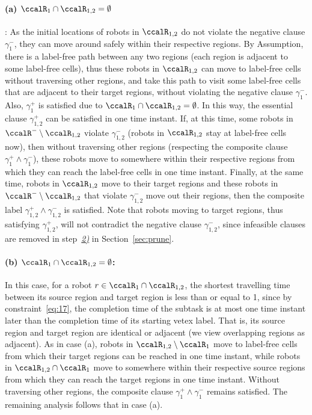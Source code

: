 \documentclass[Afour,sageh,times]{sagej}
\begin{document}
{{\paragraph{(a) $\ccalR_1 \cap \ccalR_{1,2} = \emptyset$}: As the initial locations of robots in $\ccalR_{1,2} $ do not violate the negative clause $\gamma_1^-$, they can move around safely  within their respective regions. By Assumption, there is a label-free path between any two regions (each region is adjacent to some label-free cells), thus these robots in $\ccalR_{1,2}$ can move to label-free cells without traversing other regions, and take this path to visit some label-free cells that are adjacent to their target regions, without violating the negative clause $\gamma_1^-$. Also, $\gamma_1^+$ is satisfied due to $\ccalR_1 \cap \ccalR_{1,2} = \emptyset$. In this way, the essential clause $\gamma_{1,2}^+$ can be satisfied in one time instant. If, at this time, some robots in $\ccalR^-\setminus \ccalR_{1,2}$ violate $\gamma_{1,2}^-$ (robots in $\ccalR_{1,2}$ stay at label-free cells now), then without traversing other regions (respecting the composite clause $\gamma_1^+ \wedge \gamma_1^-$), these robots  move to somewhere within their respective regions from which they can reach the label-free cells in one time instant. Finally, at the same time, robots in $\ccalR_{1,2}$ move to their target regions and these robots in $\ccalR^-\setminus \ccalR_{1,2}$ that violate $\gamma_{1,2}^-$   move out their regions, then the composite label $\gamma_{1,2}^+ \wedge \gamma_{1,2}^-$ is satisfied. Note that robots moving to target regions, thus satisfying $\gamma_{1,2}^+$, will not contradict the negative clause $\gamma_{1,2}^-$, since infeasible clauses are removed in step~\hyperref[prune:exclusion2]{\it 2)} in Section~\ref{sec:prune}.


\paragraph{(b) $\ccalR_1 \cap \ccalR_{1,2} = \emptyset$:} In this case, for a robot $r \in  \ccalR_1 \cap \ccalR_{1,2}$, the shortest travelling time between its source region and target region is less than or equal to 1, since by constraint~\eqref{eq:17}, the completion time of the subtask is at most one time instant later than the completion time of its starting vetex label. That is, its source  region and target region are identical or adjacent (we view overlapping regions as adjacent). As in case (a), robots in $\ccalR_{1,2} \setminus \ccalR_1$ move to label-free cells from which their target regions can be reached in one time instant, while robots in $\ccalR_{1,2} \cap \ccalR_1$ move to somewhere within their respective source regions from which they can reach the target regions in one time instant. Without traversing other regions, the composite clause $\gamma_1^+ \wedge \gamma_1^-$ remains satisfied. The remaining analysis follows that in case (a).


}}
\end{document}
